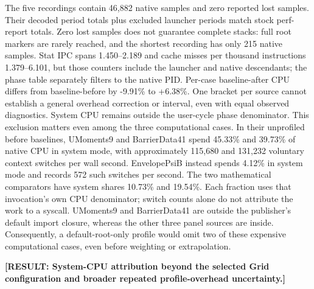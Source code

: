 \documentclass[10pt,twocolumn]{article}
\newcommand{\missing}[1]{\textbf{[RESULT: #1]}}
\begin{document}
The five recordings contain 46,882 native samples and zero reported lost
samples. Their decoded period totals plus excluded launcher periods match
stock perf-report totals.
Zero lost samples does not guarantee complete stacks: full root markers
are rarely reached, and the shortest recording has only 215 native samples.
Stat IPC spans 1.450--2.189 and cache misses per thousand instructions
1.379--6.101, but those counters include the launcher and native descendants;
the phase table separately filters to the native PID.
Per-case baseline-after CPU differs from baseline-before by -9.91\% to
+6.38\%. One bracket per source cannot establish a general overhead
correction or interval, even with equal observed diagnostics.
System CPU remains outside the user-cycle phase denominator.
This exclusion matters even among the three computational cases.
In their unprofiled before baselines, UMoments9 and BarrierData41 spend
45.33\% and 39.73\% of native CPU in system mode, with approximately
115,680 and 131,232 voluntary context switches per wall second.
EnvelopePsiB instead spends 4.12\% in system mode and records 572 such
switches per second. The two mathematical comparators have system shares
10.73\% and 19.54\%. Each fraction uses that invocation's own CPU
denominator; switch counts alone do not attribute the work to a syscall.
UMoments9 and BarrierData41 are outside the publisher's default import
closure, whereas the other three panel sources are inside.
Consequently, a default-root-only profile would omit two of these
expensive computational cases, even before weighting or extrapolation.

\missing{System-CPU attribution beyond the selected Grid configuration
and broader repeated profile-overhead uncertainty.}
\end{document}
